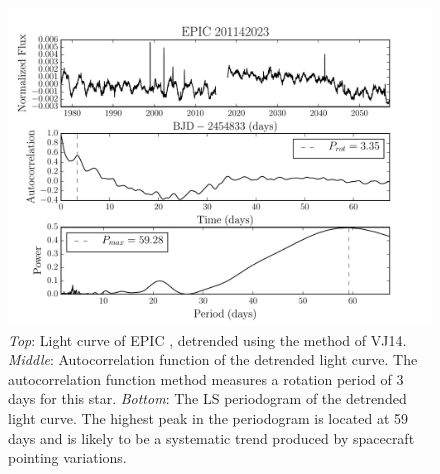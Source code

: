 \begin{figure}
\begin{center}
\includegraphics[width=6in, clip=true]{figures/rotation201142023.pdf}
\caption[Example 2: an ACF and LS periodogram of a detrended light curve.]
{{\it Top}: Light curve of EPIC \rpcc, detrended using the method
	of VJ14.
	{\it Middle}: Autocorrelation function of the detrended light curve.
	The autocorrelation function method measures a rotation period of 3
	days for this star.
	{\it Bottom}: The LS periodogram of the detrended light curve.
	The highest peak in the periodogram is located at 59 days and is likely
	to be a systematic trend produced by spacecraft pointing variations.}
\label{fig:rotation_poster_child2}
\end{center}
\end{figure}

